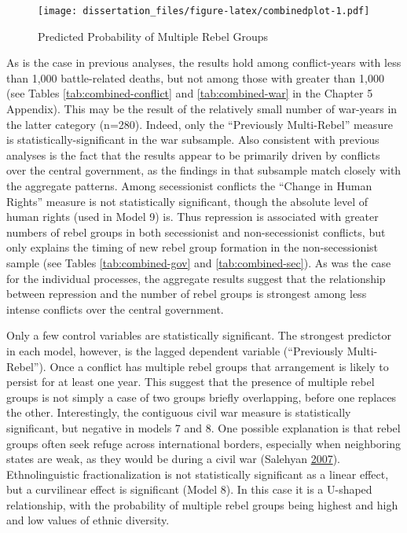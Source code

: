 \documentclass[12pt,]{book}
\theoremstyle{definition}
\theoremstyle{definition}
\theoremstyle{definition}
\theoremstyle{remark}
\begin{document}
\begin{figure}
\centering
\texttt{[image: dissertation\_files/figure-latex/combinedplot-1.pdf]}
\caption{\label{fig:combinedplot}Predicted Probability of Multiple Rebel
Groups}
\end{figure}

As is the case in previous analyses, the results hold among
conflict-years with less than 1,000 battle-related deaths, but not among
those with greater than 1,000 (see Tables \ref{tab:combined-conflict}
and \ref{tab:combined-war} in the Chapter 5 Appendix). This may be the
result of the relatively small number of war-years in the latter
category (n=280). Indeed, only the ``Previously Multi-Rebel'' measure is
statistically-significant in the war subsample. Also consistent with
previous analyses is the fact that the results appear to be primarily
driven by conflicts over the central government, as the findings in that
subsample match closely with the aggregate patterns. Among secessionist
conflicts the ``Change in Human Rights'' measure is not statistically
significant, though the absolute level of human rights (used in Model 9)
is. Thus repression is associated with greater numbers of rebel groups
in both secessionist and non-secessionist conflicts, but only explains
the timing of new rebel group formation in the non-secessionist sample
(see Tables \ref{tab:combined-gov} and \ref{tab:combined-sec}). As was
the case for the individual processes, the aggregate results suggest
that the relationship between repression and the number of rebel groups
is strongest among less intense conflicts over the central government.

Only a few control variables are statistically significant. The
strongest predictor in each model, however, is the lagged dependent
variable (``Previously Multi-Rebel''). Once a conflict has multiple
rebel groups that arrangement is likely to persist for at least one
year. This suggest that the presence of multiple rebel groups is not
simply a case of two groups briefly overlapping, before one replaces the
other. Interestingly, the contiguous civil war measure is statistically
significant, but negative in models 7 and 8. One possible explanation is
that rebel groups often seek refuge across international borders,
especially when neighboring states are weak, as they would be during a
civil war (Salehyan \protect\hyperlink{ref-salehyan07}{2007}).
Ethnolinguistic fractionalization is not statistically significant as a
linear effect, but a curvilinear effect is significant (Model 8). In
this case it is a U-shaped relationship, with the probability of
multiple rebel groups being highest and high and low values of ethnic
diversity.
\end{document}
